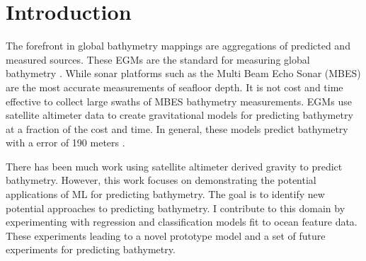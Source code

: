 
\section{Introduction}
\setlength{\parindent}{10ex}
The forefront in global bathymetry mappings are aggregations of predicted and measured sources. 
These \ac{EGM}s are the standard for measuring global bathymetry \cite{becker2009global}\cite{smith1994bathymetric}\cite{smith1997global}\cite{smith2010planning}.
While sonar platforms such as the Multi Beam Echo Sonar (MBES) \cite{farr1980multibeam} are the most accurate measurements of seafloor depth.
It is not cost and time effective to collect large swaths of \ac{MBES} bathymetry measurements.
\ac{EGM}s use satellite altimeter data to create gravitational models for predicting bathymetry at a fraction of the cost and time.
In general, these models predict bathymetry with a error of 190 meters \cite{jena2012prediction}.

\par
There has been much work using satellite altimeter derived gravity to predict bathymetry.
However, this work focuses on demonstrating the potential applications of \ac{ML} for predicting bathymetry.
The goal is to identify new potential approaches to predicting bathymetry.
I contribute to this domain by experimenting with regression and classification models fit to ocean feature data.
These experiments leading to a novel prototype model and a set of future experiments for predicting bathymetry.